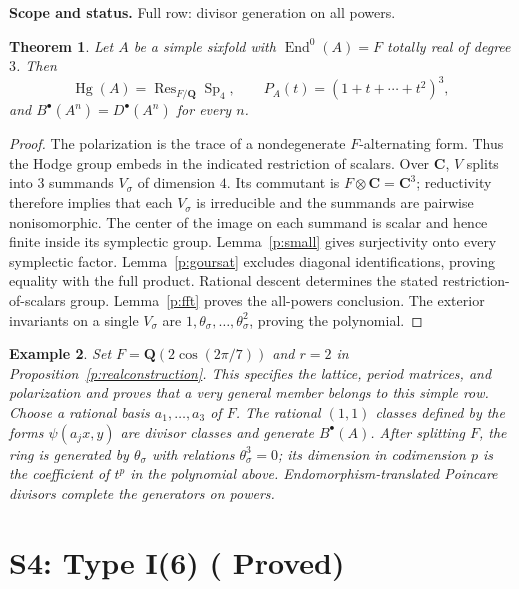 \documentclass[10pt,reqno]{article}
\theoremstyle{emphasizedplain}
\DeclareRobustCommand{\provedstatus}{%
  \texorpdfstring{\textcolor{ProvedGreen}{\textbf{Proved}}}{Proved}}
\newtheorem{theorem}{Theorem}[section]
\theoremstyle{emphasizeddefinition}
\newtheorem{example}[theorem]{Example}
\theoremstyle{emphasizeddefinition}
\DeclareMathOperator{\End}{End}
\DeclareMathOperator{\Hg}{Hg}
\DeclareMathOperator{\Sp}{Sp}
\DeclareMathOperator{\Res}{Res}
\newcommand{\Q}{\mathbf Q}
\newcommand{\C}{\mathbf C}
\newcommand{\B}{B}
\newcommand{\D}{D}
\newcommand{\status}[1]{%
  \par\nobreak\smallskip\noindent
  {\setlength{\fboxsep}{7pt}%
   \colorbox{ScopeBackground}{%
    \parbox{\dimexpr\linewidth-2\fboxsep\relax}{%
     \small\textbf{\textcolor{HeadingInk}{Scope and status.}} #1}}}%
  \par\nobreak\medskip}
\renewcommand{\small}{\fontsize{8.4}{10}\selectfont}
\begin{document}
\status{Full row: divisor generation on all powers.}
\begin{theorem}
Let $A$ be a simple sixfold with $\End^0(A)=F$ totally real of degree $3$.
Then
\[
 \Hg(A)=\Res_{F/\Q}\Sp_{4},\qquad
 P_A(t)=(1+t+\cdots+t^{2})^{3},
\]
and $\B^\bullet(A^n)=\D^\bullet(A^n)$ for every $n$.
\end{theorem}
\begin{proof}
The polarization is the trace of a nondegenerate $F$-alternating form.
Thus the Hodge group embeds in the indicated restriction of scalars.
Over $\C$, $V$ splits into $3$ summands $V_\sigma$ of dimension $4$.
Its commutant is $F\otimes\C=\C^{3}$; reductivity therefore implies that
each $V_\sigma$ is irreducible and the summands are pairwise nonisomorphic.
The center of the image on each summand is scalar and hence finite inside
its symplectic group. Lemma~\ref{p:small} gives surjectivity onto every
symplectic factor. Lemma~\ref{p:goursat} excludes diagonal identifications,
proving equality with the full product. Rational descent determines the
stated restriction-of-scalars group. Lemma~\ref{p:fft} proves the all-powers
conclusion. The exterior invariants on a single $V_\sigma$ are
$1,\theta_\sigma,\ldots,\theta_\sigma^{2}$, proving the polynomial.
\end{proof}
\begin{example}
Set $F=\Q(2\cos(2\pi/7))$ and $r=2$ in
Proposition~\ref{p:realconstruction}. This specifies the lattice, period
matrices, and polarization and proves that a very general member belongs
to this simple row. Choose a rational basis $a_1,\ldots,a_{3}$ of $F$.
The rational $(1,1)$ classes defined by the forms
$\psi(a_jx,y)$ are divisor classes and generate $\B^\bullet(A)$.
After splitting $F$, the ring is generated by $\theta_\sigma$ with
relations $\theta_\sigma^{3}=0$; its dimension in codimension $p$ is the
coefficient of $t^p$ in the polynomial above. Endomorphism-translated
Poincare divisors complete the generators on powers.
\end{example}
\section{S4: Type I(6) (\provedstatus)}\label{sec:S4}
\end{document}

